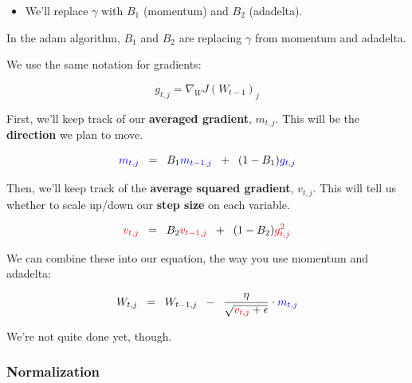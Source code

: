             \begin{itemize}
                \item We'll replace $\gamma$ with $B_1$ (momentum) and $B_2$ (adadelta).\\
            \end{itemize}

            \begin{notation}
                In the adam algorithm, $B_1$ and $B_2$ are  replacing $\gamma$ from momentum and adadelta.
            \end{notation}
    
            We use the same notation for gradients:
    
            \begin{equation}
                g_{t,j} = \nabla_W J(W_{t-1})_j
            \end{equation}
    
            First, we'll keep track of our\textbf{ averaged gradient}, $m_{t,j}$. This will be the \textbf{direction} we plan to move.

            \begin{equation}
                \textcolor{blue}{m_{t,j}} \;\;=\;\; 
                B_1 \textcolor{blue}{m_{t-1,j}} \;\;+\;\; 
                (1-B_1) \textcolor{blue}{ g_{t,j} }
            \end{equation}

            Then, we'll keep track of the \textbf{average squared gradient}, $v_{t,j}$. This will tell us whether to scale up/down our \textbf{step size} on each variable.

            \begin{equation}
                \textcolor{red}{v_{t,j}} \;\;=\;\; 
                B_2 \textcolor{red}{v_{t-1,j}} \;\;+\;\; 
                (1-B_2) \textcolor{red}{ g_{t,j}^2 }
            \end{equation}

            We can combine these into our equation, the way you use momentum and adadelta:

            \begin{equation}
                W_{t,j} \;\;=\;\; 
                W_{t-1,j}  \;\;-\;\; 
                \frac{\eta}{ \sqrt{\textcolor{red}{v_{t,j}}+\epsilon} } \cdot \textcolor{blue}{m_{t,j}}
            \end{equation}

            We're not quite done yet, though.

        \phantom{}

        \subsubsection{Normalization}

